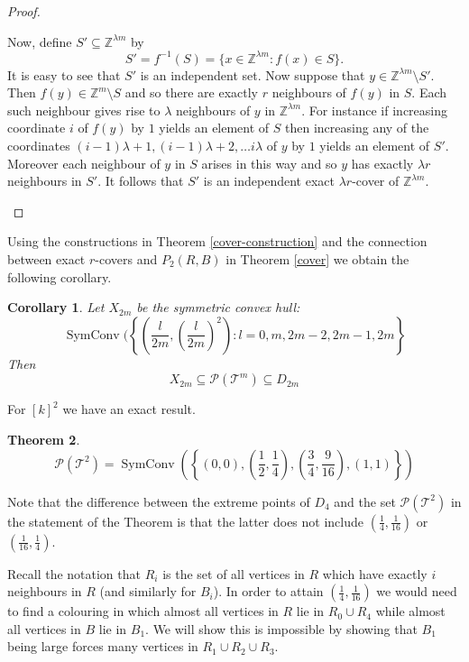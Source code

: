 \documentclass[12pt,a4paper]{article}
\newcommand{\Z}{\mathbb Z}
\newcommand{\T}{\mathcal T}
\newcommand{\Pcal}{\mathcal P}
\DeclareMathOperator{\sch}{SymConv}
\newtheorem{thm}{Theorem}
\newtheorem{cor}[thm]{Corollary}
\begin{document}
\begin{proof}
\begin{enumerate}
Now, define $S'\subseteq\Z^{\lambda m}$ by
\[
S'=f^{-1}(S)=\{x\in\Z^{\lambda m} : f(x)\in S\}.
\]
It is easy to see that $S'$ is an independent set. Now suppose that $y\in\Z^{\lambda m}\setminus S'$. Then $f(y)\in\Z^m\setminus S$ and so there are exactly $r$ neighbours of $f(y)$ in $S$. Each such neighbour gives rise to $\lambda$ neighbours of $y$ in $\Z^{\lambda m}$. For instance if increasing coordinate $i$ of $f(y)$ by $1$ yields an element of $S$ then increasing any of the coordinates $(i-1)\lambda+1,(i-1)\lambda+2,\ldots i\lambda$ of $y$ by $1$ yields an element of $S'$. Moreover each neighbour of $y$ in $S$ arises in this way and so $y$ has exactly $\lambda r$ neighbours in $S'$. It follows that $S'$ is an independent exact $\lambda r$-cover of $\Z^{\lambda m}$.
\end{enumerate}
\end{proof}

Using the constructions in Theorem \ref{cover-construction} and the connection between exact $r$-covers and $P_2(R,B)$ in Theorem \ref{cover} we obtain the following corollary.

\begin{cor}\label{construction}
Let $X_{2m}$ be the symmetric convex hull:
\[
\sch(\left\{\left(\frac{l}{2m},\left(\frac{l}{2m}\right)^2\right) : l=0,m,2m-2,2m-1,2m\right\}
\]
Then
\[
X_{2m}\subseteq\Pcal(\T^m)\subseteq D_{2m}
\]
\end{cor}

For $[k]^2$ we have an exact result.

\begin{thm}\label{2d-torus}
\[
\Pcal(\T^2)=\sch\left(\left\{\left(0,0\right),\left(\frac{1}{2},\frac{1}{4}\right),\left(\frac{3}{4},\frac{9}{16}\right),\left(1,1\right)\right\}\right)
\]
\end{thm}

Note that the difference between the extreme points of $D_4$ and the set $\Pcal(\T^2)$ in the statement of the Theorem is that the latter does not include $(\frac{1}{4},\frac{1}{16})$ or $(\frac{1}{16},\frac{1}{4})$. 

Recall the notation that $R_i$ is the set of all vertices in $R$ which have exactly $i$ neighbours in $R$ (and similarly for $B_i$). In order to attain $(\frac{1}{4},\frac{1}{16})$ we would need to find a colouring in which almost all vertices in $R$ lie in $R_0\cup R_4$ while almost all vertices in $B$ lie in $B_1$. We will show this is impossible by showing that $B_1$ being large forces many vertices in $R_1\cup R_2\cup R_3$.
\end{document}
